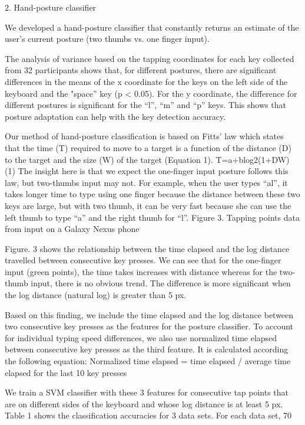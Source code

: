 \documentclass{sigchi}
\begin{document}
2. Hand-posture classifier

We developed a hand-posture classifier that constantly returns an estimate of the user’s current posture (two thumbs vs. one finger input).

The analysis of variance based on the tapping coordinates for each key collected from 32 participants shows that, for different postures, there are significant differences in the means of the x coordinate for the keys on the left side of the keyboard and the "space” key (p < 0.05). For the y coordinate, the difference for different postures is significant for the “l”, “m” and “p” keys. This shows that posture adaptation can help with the key detection accuracy.

Our method of hand-posture classification is based on Fitts’ law which states that the time (T) required to move to a target is a function of the distance (D) to the target and the size (W) of the target (Equation 1).
T=a+blog2(1+DW)                                                  (1)
The insight here is that we expect the one-finger input posture follows this law,  but two-thumbs input may not. For example, when the user types “al”, it takes longer time to type using one finger because the distance between these two keys are large, but with two thumb, it can be very fast because she can use the left thumb to type “a” and the right thumb for “l”.
Figure 3. Tapping points data from input on a Galaxy Nexus phone

Figure. 3 shows the relationship between the time elapsed  and the log distance travelled between consecutive key presses. We can see that for the one-finger input (green points), the time takes increases with distance whereas for the two-thumb input, there is no obvious trend. The difference is more significant when the log distance (natural log) is greater than 5 px.

Based on this finding, we include the time elapsed and the log distance between two consecutive key presses as the features for the posture classifier. To account for individual typing speed differences, we also use normalized time elapsed between consecutive key presses as the third feature. It is calculated according the following equation:
Normalized time elapsed = time elapsed / average time elapsed for the last 10 key presses

We train a SVM classifier with these 3 features for consecutive tap points that are on different sides of the keyboard and whose log distance is at least 5 px. Table 1 shows the classification accuracies for 3 data sets. For each data set, 70%
\end{document}
